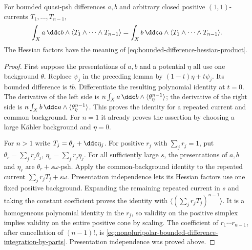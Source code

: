 \begin{theorem}\label{thm:nonpluripolar-bounded-difference-integration-by-parts}
For bounded quasi-psh differences $a,b$ and arbitrary closed positive $(1,1)$-currents $T_1,\ldots,T_{n-1}$,
\begin{equation}\label{eq:nonpluripolar-bounded-difference-integration-by-parts}
 \int_Xa\,\ddc b\wedge\langle T_1\wedge\cdots\wedge T_{n-1}\rangle
       =\int_Xb\,\ddc a\wedge\langle T_1\wedge\cdots\wedge T_{n-1}\rangle.
\end{equation}
The Hessian factors have the meaning of \eqref{eq:bounded-difference-hessian-product}.
\end{theorem}
\begin{proof}
First suppose the presentations of $a,b$ and a potential $\eta$ all use one background $\theta$. Replace $\psi_j$ in the preceding lemma by
$(1-t)\eta+t\psi_j$. Its bounded difference is $tb$. Differentiate the resulting polynomial identity at $t=0$. The derivative of the left side is
$n\int_Xa\,\ddc b\wedge\langle\theta_\eta^{n-1}\rangle$;
the derivative of the right side is
$n\int_Xb\,\ddc a\wedge\langle\theta_\eta^{n-1}\rangle$.
This proves the identity for a repeated current and common background. For $n=1$ it already proves the assertion by choosing a large K\"ahler background and $\eta=0$.

For $n>1$ write $T_j=\theta_j+\ddc\eta_j$. For positive $r_j$ with $\sum_jr_j=1$, put
$\theta_r=\sum_jr_j\theta_j$, $\eta_r=\sum_jr_j\eta_j$.
For all sufficiently large $s$, the presentations of $a,b$ and $\eta_r$ are $\theta_r+s\omega$-psh. Apply the common-background identity to the repeated current
$\sum_jr_jT_j+s\omega$. Presentation independence lets its Hessian factors use one fixed positive background. Expanding the remaining repeated current in $s$ and taking the constant coefficient proves the identity with $\langle(\sum_jr_jT_j)^{n-1}\rangle$. It is a homogeneous polynomial identity in the $r_j$, so validity on the positive simplex implies validity on the entire positive cone by scaling. The coefficient of $r_1\cdots r_{n-1}$, after cancellation of $(n-1)!$, is \eqref{eq:nonpluripolar-bounded-difference-integration-by-parts}. Presentation independence was proved above.
\end{proof}

